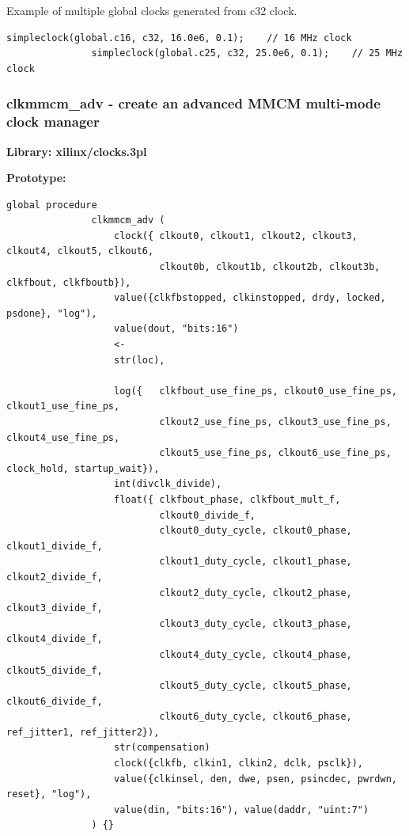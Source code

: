             Example of multiple global clocks generated from c32 clock.

            \begin{lstlisting}[gobble=12, language=threepl]
               simpleclock(global.c16, c32, 16.0e6, 0.1);    // 16 MHz clock
               simpleclock(global.c25, c32, 25.0e6, 0.1);    // 25 MHz clock
            \end{lstlisting}




        \subsubsection{clkmmcm\_adv - create an advanced MMCM multi-mode clock manager }\label{sec:lpmmcma}
            
            {\bf Library: xilinx/clocks.3pl}

            {\bf Prototype:} \\
            \vsp
            \begin{lstlisting}[gobble=12, language=threepl]
               global procedure
               clkmmcm_adv (
                   clock({ clkout0, clkout1, clkout2, clkout3, clkout4, clkout5, clkout6,
                           clkout0b, clkout1b, clkout2b, clkout3b, clkfbout, clkfboutb}),
                   value({clkfbstopped, clkinstopped, drdy, locked, psdone}, "log"),
                   value(dout, "bits:16")
                   <-
                   str(loc),

                   log({   clkfbout_use_fine_ps, clkout0_use_fine_ps, clkout1_use_fine_ps,
                           clkout2_use_fine_ps, clkout3_use_fine_ps, clkout4_use_fine_ps,
                           clkout5_use_fine_ps, clkout6_use_fine_ps, clock_hold, startup_wait}),
                   int(divclk_divide),
                   float({ clkfbout_phase, clkfbout_mult_f,
                           clkout0_divide_f,
                           clkout0_duty_cycle, clkout0_phase, clkout1_divide_f,
                           clkout1_duty_cycle, clkout1_phase, clkout2_divide_f,
                           clkout2_duty_cycle, clkout2_phase, clkout3_divide_f,
                           clkout3_duty_cycle, clkout3_phase, clkout4_divide_f,
                           clkout4_duty_cycle, clkout4_phase, clkout5_divide_f,
                           clkout5_duty_cycle, clkout5_phase, clkout6_divide_f,
                           clkout6_duty_cycle, clkout6_phase, ref_jitter1, ref_jitter2}),
                   str(compensation)
                   clock({clkfb, clkin1, clkin2, dclk, psclk}),
                   value({clkinsel, den, dwe, psen, psincdec, pwrdwn, reset}, "log"),
                   value(din, "bits:16"), value(daddr, "uint:7")
               ) {}
            \end{lstlisting}

